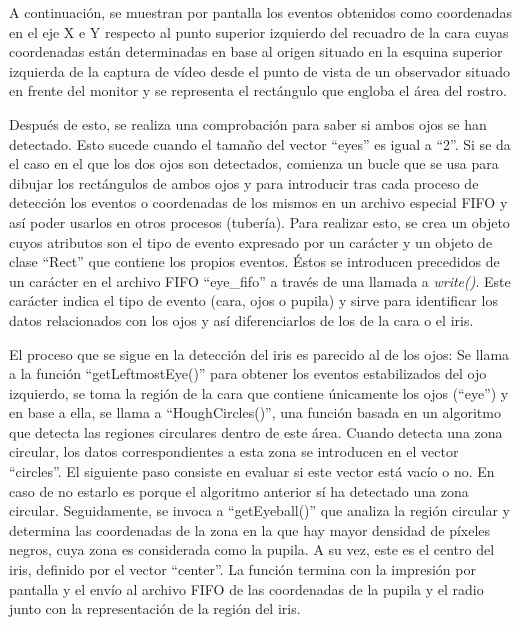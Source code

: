 \begin{itemize}
\begin{listing}[p]
\begin{minted}[bgcolor=bg,
               frame=lines,
               framesep=2mm,
               linenos,
               breaklines,
               breakanywhere]
        cv::circle(frame, faces[0].tl() + eyeRect.tl() + center, radius, cv::Scalar(0, 0, 255), 2);
        cv::circle(eye, center, radius, cv::Scalar(255, 255, 255), 2);
    }
    cv::imshow("Eye", eye);
}
\end{verbatim}
\caption{Detección del área rectangular que contiene los ojos}
\label{Lis: arearectangular}
\end{listing}

A continuación, se muestran por pantalla los eventos obtenidos como coordenadas en el eje X e Y respecto al punto superior izquierdo del recuadro de la cara cuyas coordenadas están determinadas en base al origen situado en la esquina superior izquierda de la captura de vídeo desde el punto de vista de un observador situado en frente del monitor y se representa el rectángulo que engloba el área del rostro.

Después de esto, se realiza una comprobación para saber si ambos ojos se han detectado. Esto sucede cuando el tamaño del vector ``eyes'' es igual a ``2''. Si se da el caso en el que los dos ojos son detectados, comienza un bucle que se usa para dibujar los rectángulos de ambos ojos y para introducir tras cada proceso de detección los eventos o coordenadas de los mismos en un archivo especial FIFO y así poder usarlos en otros procesos (tubería). Para realizar esto, se crea un objeto cuyos atributos son el tipo de evento expresado por un carácter y un objeto de clase ``Rect'' que contiene los propios eventos. Éstos se introducen precedidos de un carácter en el archivo FIFO ``eye\_fifo'' a través de una llamada a {\itshape write()}. Este carácter indica el tipo de evento (cara, ojos o pupila) y sirve para identificar los datos relacionados con los ojos y así diferenciarlos de los de la cara o el iris.
    
El proceso que se sigue en la detección del iris es parecido al de los ojos: Se llama a la función ``getLeftmostEye()'' para obtener los eventos estabilizados del ojo izquierdo, se toma la región de la cara que contiene únicamente los ojos (``eye'') y en base a ella, se llama a ``HoughCircles()'', una función basada en un algoritmo que detecta las regiones circulares dentro de este área. Cuando detecta una zona circular, los datos correspondientes a esta zona se introducen en el vector ``circles''. El siguiente paso consiste en evaluar si este vector está vacío o no. En caso de no estarlo es porque el algoritmo anterior sí ha detectado una zona circular. Seguidamente, se invoca a ``getEyeball()'' que analiza la región circular y determina las coordenadas de la zona en la que hay mayor densidad de píxeles negros, cuya zona es considerada como la pupila. A su vez, este es el centro del iris, definido por el vector ``center''. La función termina con la impresión por pantalla y el envío al archivo FIFO de las coordenadas de la pupila y el radio junto con la representación de la región del iris.


\end{itemize}
